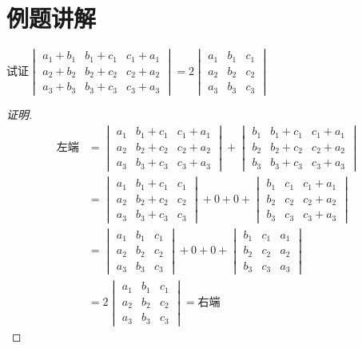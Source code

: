 
\section{例题讲解}

\begin{eg}
试证$\begin{vmatrix} a_1+b_1 & b_1+c_1 & c_1+a_1 \\ a_2+b_2 & b_2+c_2 & c_2+a_2 \\ a_3+b_3 & b_3+c_3 & c_3+a_3 \end{vmatrix} = 2\begin{vmatrix} a_1 & b_1 & c_1 \\ a_2 & b_2 & c_2 \\ a_3 & b_3 & c_3 \end{vmatrix}$
\end{eg}
\begin{proof}[证明]
\begin{align*}
\text{左端} & = \begin{vmatrix} a_1 & b_1+c_1 & c_1+a_1 \\ a_2 & b_2+c_2 & c_2+a_2 \\ a_3 & b_3+c_3 & c_3+a_3 \end{vmatrix} + \begin{vmatrix} b_1 & b_1+c_1 & c_1+a_1 \\ b_2 & b_2+c_2 & c_2+a_2 \\ b_3 & b_3+c_3 & c_3+a_3 \end{vmatrix} \\
& = \begin{vmatrix} a_1 & b_1+c_1 & c_1 \\ a_2 & b_2+c_2 & c_2 \\ a_3 & b_3+c_3 & c_3 \end{vmatrix} + 0 + 0 + \begin{vmatrix} b_1 & c_1 & c_1+a_1 \\ b_2 & c_2 & c_2+a_2 \\ b_3 & c_3 & c_3+a_3 \end{vmatrix} \\
& = \begin{vmatrix} a_1 & b_1 & c_1 \\ a_2 & b_2 & c_2 \\ a_3 & b_3 & c_3 \end{vmatrix} + 0 + 0 + \begin{vmatrix} b_1 & c_1 & a_1 \\ b_2 & c_2 & a_2 \\ b_3 & c_3 & a_3 \end{vmatrix} \\
& = 2\begin{vmatrix} a_1 & b_1 & c_1 \\ a_2 & b_2 & c_2 \\ a_3 & b_3 & c_3 \end{vmatrix} = \text{右端}
\end{align*}
\end{proof}

